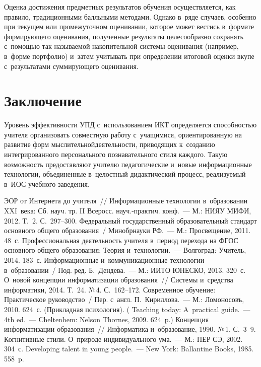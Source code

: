 \begin{multicols}{2}
{}

  Оценка достижения предметных результатов обучения осуществляется, как правило,
традиционными балльными методами. Однако в~ряде случаев, особенно при текущем или
промежуточном оценивании, которое может вестись в~формате формирующего оценивания,
полученные результаты целесообразно сохранять с~помощью так называемой накопительной
системы оценивания (например, в~форме портфолио) и~затем учитывать при определении
итоговой оценки вкупе с~результатами суммирующего оценивания.

\section{Заключение}

  Уровень эффективности УПД с~использованием ИКТ
определяется способностью учителя организовать совместную работу с~учащимися,
ориентированную на развитие форм мыслительной\linebreak деятель\-ности, приводящих к~созданию
интегрированного персонального познавательного стиля каж\-до\-го. Такую возможность
предоставляют учи\-телю педагогические и~новые информационные техноло\-гии, объединенные
в~целостный дидактический процесс, реализуемый в~ИОС
учебного заведения.

{\small\frenchspacing
 {%
 \begin{thebibliography}{99}
 ЭОР от Интернета до учителя~// Информационные
технологии в~образовании XXI~века: Сб. науч. тр. II Всеросс. науч.-практич. конф.~--- М.:
НИЯУ МИФИ, 2012. Т.~2. С.~297--300.
Федеральный государственный образовательный стандарт основного общего образования~/
Минобрнауки РФ.~--- М.: Просвещение, 2011. 48~с. %
 Профессиональная деятельность учителя в~период перехода на ФГОС
основного общего образования: Теория и~технологии.~--- Волгоград: Учитель, 2014. 183~с.
Информационные и~коммуникационные технологии в~образовании~/ Под. ред.
Б.~Дендева.~--- М.: ИИТО ЮНЕСКО, 2013. 320~с.
 О~новой концепции
информатизации образования~// Системы и~средства информатики, 2014. Т.~24. №\,4.
С.~162--172.
 Современное обучение: Практическое руководство~/ Пер. с~англ.
П.~Кириллова.~--- М.: Ломоносовъ, 2010. 624~с. (Прикладная психология).
(
Teaching today: A~practical guide.~--- 4th ed.~--- Cheltenhem: Nelson Thornes, 2009. 624~p.)
Концепция информатизации образования~// Информатика и~образование, 1990. №\,1. С.~3--9.
 Когнитивные стили. О~природе индивидуального ума.~--- М.: ПЕР СЭ, 2002. 304~с.
 Developing talent in young people.~--- New York: Ballantine Books, 1985. 558~p.


\end{thebibliography}}}
\end{multicols}
